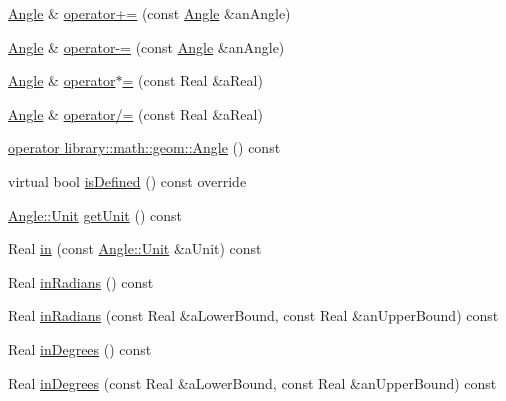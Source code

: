 \begin{DoxyCompactItemize}
\item 
\hyperlink{classlibrary_1_1physics_1_1units_1_1_angle}{Angle} \& \hyperlink{classlibrary_1_1physics_1_1units_1_1_angle_a5f20b012cb332e631a6271144a0817a2}{operator+=} (const \hyperlink{classlibrary_1_1physics_1_1units_1_1_angle}{Angle} \&an\+Angle)
\item 
\hyperlink{classlibrary_1_1physics_1_1units_1_1_angle}{Angle} \& \hyperlink{classlibrary_1_1physics_1_1units_1_1_angle_a2278161c893f91578913951c62f29c39}{operator-\/=} (const \hyperlink{classlibrary_1_1physics_1_1units_1_1_angle}{Angle} \&an\+Angle)
\item 
\hyperlink{classlibrary_1_1physics_1_1units_1_1_angle}{Angle} \& \hyperlink{classlibrary_1_1physics_1_1units_1_1_angle_af14d361f18244d859a3829c40aba6a14}{operator$\ast$=} (const Real \&a\+Real)
\item 
\hyperlink{classlibrary_1_1physics_1_1units_1_1_angle}{Angle} \& \hyperlink{classlibrary_1_1physics_1_1units_1_1_angle_a55f228924439a814b8727ae62585df95}{operator/=} (const Real \&a\+Real)
\item 
\hyperlink{classlibrary_1_1physics_1_1units_1_1_angle_a1745d0762e2791835c835e79219b005b}{operator library\+::math\+::geom\+::\+Angle} () const
\item 
virtual bool \hyperlink{classlibrary_1_1physics_1_1units_1_1_angle_a77c7849734ce02b55e070fb88fd87f71}{is\+Defined} () const override
\item 
\hyperlink{classlibrary_1_1physics_1_1units_1_1_angle_a3c329d415a61783b16ce481874cc5956}{Angle\+::\+Unit} \hyperlink{classlibrary_1_1physics_1_1units_1_1_angle_a44ca98d9a05643948f5d3bee79bcba63}{get\+Unit} () const
\item 
Real \hyperlink{classlibrary_1_1physics_1_1units_1_1_angle_aa641b9b6dabfe5fa0b546a2d6492e5be}{in} (const \hyperlink{classlibrary_1_1physics_1_1units_1_1_angle_a3c329d415a61783b16ce481874cc5956}{Angle\+::\+Unit} \&a\+Unit) const
\item 
Real \hyperlink{classlibrary_1_1physics_1_1units_1_1_angle_ab6157462a9d4afe64f4dd11d1b684af9}{in\+Radians} () const
\item 
Real \hyperlink{classlibrary_1_1physics_1_1units_1_1_angle_a6dfbf2ff95818818cecfd60e121dfb75}{in\+Radians} (const Real \&a\+Lower\+Bound, const Real \&an\+Upper\+Bound) const
\item 
Real \hyperlink{classlibrary_1_1physics_1_1units_1_1_angle_a58528bdfdbd6976ee88055809c835e68}{in\+Degrees} () const
\item 
Real \hyperlink{classlibrary_1_1physics_1_1units_1_1_angle_a21fa4d9aa81f1e27d9869e0c8a9cb46b}{in\+Degrees} (const Real \&a\+Lower\+Bound, const Real \&an\+Upper\+Bound) const

\end{DoxyCompactItemize}
